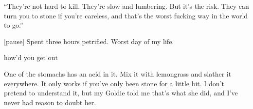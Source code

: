 \begin{multicols}{2}
  \hline

  ``They're not hard to kill.
    They're slow and lumbering.
    But it's the risk.
    They can turn you to stone if you're careless, and that's the worst fucking way in the world
      to go.''

  [pause]
  Spent three hours petrified.
  Worst day of my life.

  how'd you get out

  One of the stomachs has an acid in it.
  Mix it with lemongrass and slather it everywhere.
  It only works if you've only been stone for a little bit.
  I don't pretend to understand it, but my Goldie told me that's what she did, and I've never had
    reason to doubt her.


\end{multicols}

